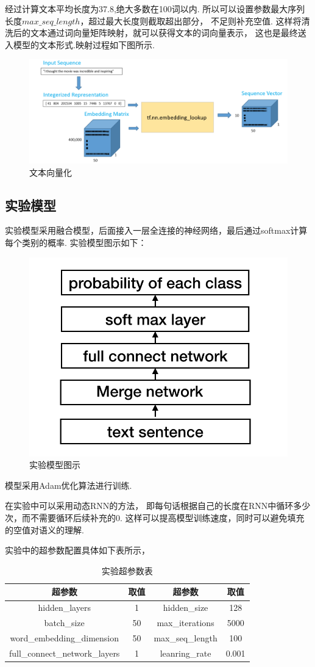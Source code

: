 \documentclass[bachelor,adobefonts]{jnuthesis}
\begin{document}
经过计算文本平均长度为37.8,绝大多数在100词以内.
所以可以设置参数最大序列长度$max\_seq\_length$，超过最大长度则截取超出部分，
不足则补充空值.
这样将清洗后的文本通过词向量矩阵映射，就可以获得文本的词向量表示，
这也是最终送入模型的文本形式.映射过程如下图所示.

\begin{figure}[h!]
  \centering
  \includegraphics[width=0.95\linewidth]{词向量映射.png}
  \caption{文本向量化}
\end{figure}


\subsection{实验模型}
实验模型采用融合模型，后面接入一层全连接的神经网络，最后通过softmax计算每个类别的概率.
实验模型图示如下：
\begin{figure}[h!]
  \centering
  \includegraphics[width=0.4\linewidth]{分类模型.png}
  \caption{实验模型图示}
\end{figure}

模型采用Adam优化算法\cite{Kingma2014Adam}进行训练.

在实验中可以采用动态RNN的方法，
即每句话根据自己的长度在RNN中循环多少次，而不需要循环后续补充的0.
这样可以提高模型训练速度，同时可以避免填充的空值对语义的理解.

实验中的超参数配置具体如下表所示，

\begin{table}[h!]
  \centering
  \begin{tabular}{cccc}
    \toprule
    \textbf{超参数} & \textbf{取值} & \textbf{超参数} & \textbf{取值}  \\
    \midrule
    hidden\_layers & 1 & hidden\_size & 128 \\
    batch\_size &  50 & max\_iterations & 5000 \\
    word\_embedding\_dimension & 50 & max\_seq\_length & 100 \\
    full\_connect\_network\_layers & 1 & leanring\_rate & 0.001 \\
    \bottomrule
  \end{tabular}
  \caption{实验超参数表}
\end{table}
\end{document}
